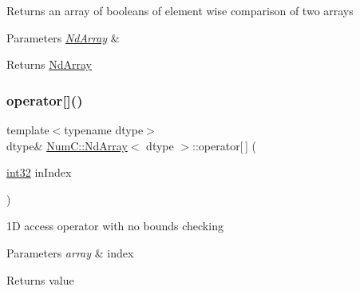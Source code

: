 Returns an array of booleans of element wise comparison of two arrays


\begin{DoxyParams}{Parameters}
{\em \mbox{\hyperlink{class_num_c_1_1_nd_array}{Nd\+Array}}} & \\
\hline
\end{DoxyParams}
\begin{DoxyReturn}{Returns}
\mbox{\hyperlink{class_num_c_1_1_nd_array}{Nd\+Array}} 
\end{DoxyReturn}
\mbox{\label{class_num_c_1_1_nd_array_a2691e9a00d2312da23cb97bb22fcddc9}} 
\subsubsection{\texorpdfstring{operator[]()}{operator[]()}\hspace{0.1cm}{\footnotesize\ttfamily [1/3]}}
{\footnotesize\ttfamily template$<$typename dtype$>$ \\
dtype\& \mbox{\hyperlink{class_num_c_1_1_nd_array}{Num\+C\+::\+Nd\+Array}}$<$ dtype $>$\+::operator\mbox{[}$\,$\mbox{]} (\begin{DoxyParamCaption}\item[{\mbox{\hyperlink{namespace_num_c_aa5a7e69266097d55816d4cdb19542b53}{int32}}}]{in\+Index }\end{DoxyParamCaption})\hspace{0.3cm}{\ttfamily [inline]}}

1D access operator with no bounds checking


\begin{DoxyParams}{Parameters}
{\em array} & index \\
\hline
\end{DoxyParams}
\begin{DoxyReturn}{Returns}
value 
\end{DoxyReturn}
\mbox{\label{class_num_c_1_1_nd_array_a1304c70c1a2360b370792a6be37e94cd}} 
